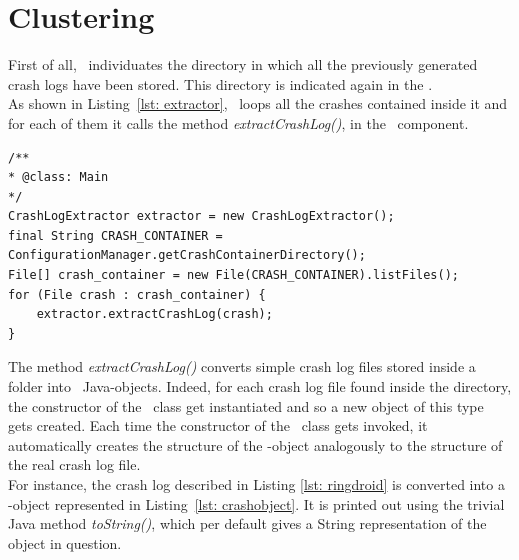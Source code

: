 \section{Clustering}
\label{tool: clustering}


First of all, \toolname\ individuates the directory in which all the previously generated crash logs have been stored. This directory is indicated again in the \Config.\\  
As shown in Listing~\ref{lst: extractor}, \toolname\ loops all the crashes contained inside it and for each of them it calls the method \textit{extractCrashLog()}, in the \Extractor\ component. 

\begin{lstlisting}[caption=\Extractor\ code snippet converting crash files into CrashLog objects,label={lst: extractor}]
/**
* @class: Main
*/
CrashLogExtractor extractor = new CrashLogExtractor();
final String CRASH_CONTAINER = ConfigurationManager.getCrashContainerDirectory();
File[] crash_container = new File(CRASH_CONTAINER).listFiles();
for (File crash : crash_container) {
	extractor.extractCrashLog(crash);
}
\end{lstlisting} 
The method \textit{extractCrashLog()} converts simple crash log files stored inside a folder into \Crash\ Java-objects. 
Indeed, for each crash log file found inside the directory, the constructor of the \Crash\ class get instantiated and so a new object of this type gets created. Each time the constructor of the \Crash\ class gets invoked, it automatically creates the structure of the \Crash-object analogously to the structure of the real crash log file. \\
For instance, the crash log described in Listing \ref{lst: ringdroid} is converted into a \Crash-object represented in Listing~\ref{lst: crashobject}.
It is printed out using the trivial Java method \textit{toString()}, which  per default gives a String representation of the object in question.  

